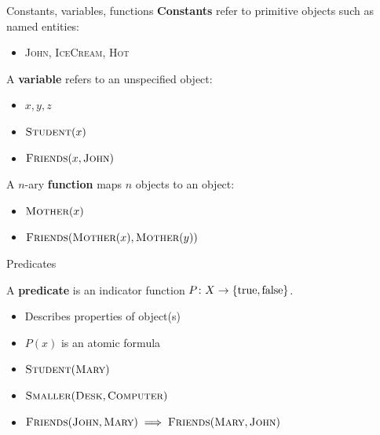 \documentclass[usenames,dvipsnames,notes]{beamer}
\begin{document}
\begin{frame}
    {Constants, variables, functions}
    \textbf{Constants} refer to primitive objects such as named entities:\\
    \begin{itemize}
        \item[] \textsc{John}, \textsc{IceCream}, \textsc{Hot}
    \end{itemize}

    A \textbf{variable} refers to an unspecified object:\\
    \begin{itemize}
        \item[] $x,y,z$
        \item[] $\textsc{Student}(x)$
        \item[] $\textsc{Friends}(x, \textsc{John})$
    \end{itemize}

    A $n$-ary \textbf{function} maps $n$ objects to an object:\\
    \begin{itemize}
        \item[] $\textsc{Mother}(x)$
        \item[] $\textsc{Friends}(\textsc{Mother}(x), \textsc{Mother}(y))$
    \end{itemize}
\end{frame}

\begin{frame}
    {Predicates}

    A \textbf{predicate} is an indicator function $P\colon X\rightarrow \left\{ \text{true}, \text{false} \right\}$.\\
    \begin{itemize}
        \item Describes properties of object(s)
        \item $P(x)$ is an atomic formula
        \item[] $\textsc{Student}(\textsc{Mary})$
        \item[] $\textsc{Smaller}(\textsc{Desk}, \textsc{Computer})$
        \item[] $\textsc{Friends}(\textsc{John}, \textsc{Mary}) \implies \textsc{Friends}(\textsc{Mary}, \textsc{John})$
    \end{itemize}
\end{frame}
\end{document}
